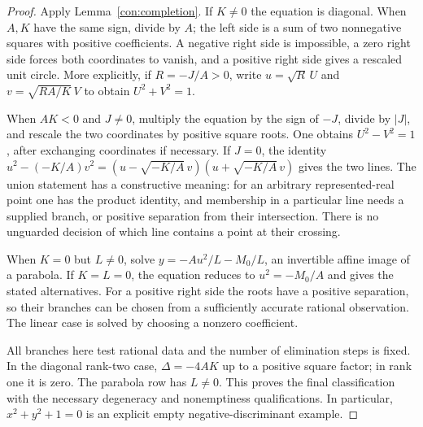 \begin{proof}
Apply Lemma~\ref{con:completion}. If $K\ne0$ the equation is diagonal.
When $A,K$ have the same sign, divide by $A$; the left side is a sum
of two nonnegative squares with positive coefficients. A negative right
side is impossible, a zero right side forces both coordinates to vanish,
and a positive right side gives a rescaled unit circle. More explicitly,
if $R=-J/A>0$, write $u=\sqrt R\,U$ and
$v=\sqrt{R A/K}\,V$ to obtain $U^2+V^2=1$.

When $AK<0$ and $J\ne0$, multiply the equation by the sign of $-J$,
divide by $|J|$, and rescale the two coordinates by positive square roots.
One obtains $U^2-V^2=1$, after exchanging coordinates if necessary.
If $J=0$, the identity
$u^2-(-K/A)v^2=(u-\sqrt{-K/A}\,v)(u+\sqrt{-K/A}\,v)$
gives the two lines. The union statement has a constructive meaning:
for an arbitrary represented-real point one has the product identity,
and membership in a particular line needs a supplied branch, or positive
separation from their intersection. There is no unguarded decision of
which line contains a point at their crossing.

When $K=0$ but $L\ne0$, solve
$y=-Au^2/L-M_0/L$, an invertible affine image of a parabola. If $K=L=0$,
the equation reduces to $u^2=-M_0/A$ and gives the stated alternatives.
For a positive right side the roots have a positive separation, so their
branches can be chosen from a sufficiently accurate rational observation.
The linear case is solved by choosing a nonzero coefficient.

All branches here test rational data and the number of elimination steps
is fixed. In the diagonal rank-two case, $\Delta=-4AK$ up to a positive
square factor; in rank one it is zero. The parabola row has $L\ne0$.
This proves the final classification with the necessary degeneracy and
nonemptiness qualifications. In particular, $x^2+y^2+1=0$ is an explicit
empty negative-discriminant example.
\end{proof}

